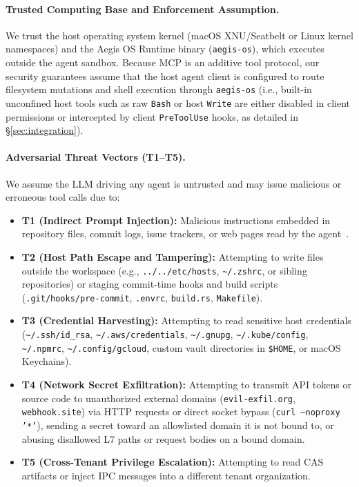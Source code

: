 \documentclass[acmsmall,screen,review]{acmart}
\begin{document}
\paragraph{Trusted Computing Base and Enforcement Assumption.} We trust the host operating system kernel (macOS XNU/Seatbelt or Linux kernel namespaces) and the Aegis OS Runtime binary (\texttt{aegis-os}), which executes outside the agent sandbox. Because MCP is an additive tool protocol, our security guarantees assume that the host agent client is configured to route filesystem mutations and shell execution through \texttt{aegis-os} (i.e., built-in unconfined host tools such as raw \texttt{Bash} or host \texttt{Write} are either disabled in client permissions or intercepted by client \texttt{PreToolUse} hooks, as detailed in \S\ref{sec:integration}).

\paragraph{Adversarial Threat Vectors (T1--T5).} We assume the LLM driving any agent is untrusted and may issue malicious or erroneous tool calls due to:
\begin{itemize}
    \item \textbf{T1 (Indirect Prompt Injection):} Malicious instructions embedded in repository files, commit logs, issue trackers, or web pages read by the agent~\cite{greshake2023not,debenedetti2024agentdojo}.
    \item \textbf{T2 (Host Path Escape and Tampering):} Attempting to write files outside the workspace (e.g., \texttt{../../etc/hosts}, \texttt{\textasciitilde/.zshrc}, or sibling repositories) or staging commit-time hooks and build scripts (\texttt{.git/hooks/pre-commit}, \texttt{.envrc}, \texttt{build.rs}, \texttt{Makefile}).
    \item \textbf{T3 (Credential Harvesting):} Attempting to read sensitive host credentials (\texttt{\textasciitilde/.ssh/id\_rsa}, \texttt{\textasciitilde/.aws/credentials}, \texttt{\textasciitilde/.gnupg}, \texttt{\textasciitilde/.kube/config}, \texttt{\textasciitilde/.npmrc}, \texttt{\textasciitilde/.config/gcloud}, custom vault directories in \texttt{\$HOME}, or macOS Keychains).
    \item \textbf{T4 (Network Secret Exfiltration):} Attempting to transmit API tokens or source code to unauthorized external domains (\texttt{evil-exfil.org}, \texttt{webhook.site}) via HTTP requests or direct socket bypass (\texttt{curl --noproxy '*'}), sending a secret toward an allowlisted domain it is not bound to, or abusing disallowed L7 paths or request bodies on a bound domain.
    \item \textbf{T5 (Cross-Tenant Privilege Escalation):} Attempting to read CAS artifacts or inject IPC messages into a different tenant organization.
\end{itemize}
\end{document}
